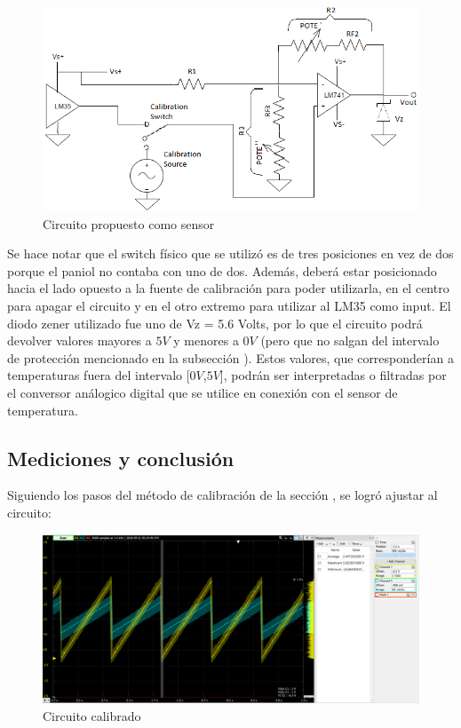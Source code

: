 \documentclass[../../main.tex]{subfiles}
\begin{document}
\begin{figure}[H]	%
	\centering
	\includegraphics[scale=1.2]{imagenes/combinacion_circuito.png}
	\caption{Circuito propuesto como sensor}
	\label{fig:ej6_combinacion_circuito}
\end{figure}

Se hace notar que el switch físico que se utilizó es de tres posiciones en vez de dos porque el paniol no contaba con uno de dos. Además, deberá estar posicionado hacia el lado opuesto a la fuente de calibración para poder utilizarla, en el centro para apagar el circuito y en el otro extremo para utilizar al LM35 como input.
El diodo zener utilizado fue uno de Vz = 5.6 Volts, por lo que el circuito podrá devolver valores mayores a $5V$ y menores a $0V$ (pero que no salgan del intervalo de protección mencionado en la subsección ). Estos valores, que corresponderían a temperaturas fuera del intervalo [$0V$,$5V$], podrán ser interpretadas o filtradas por el conversor análogico digital que se utilice en conexión con el sensor de temperatura.
   
\subsection{Mediciones y conclusión}

Siguiendo los pasos del método de calibración de la sección , se logró ajustar al circuito:

\begin{figure}[H]	%
	\centering
	\includegraphics[scale=0.4]{imagenes/sensor_calibrado.png}
	\caption{Circuito calibrado}
	\label{fig:ej6_sensor_calibrado}
\end{figure}
\end{document}
